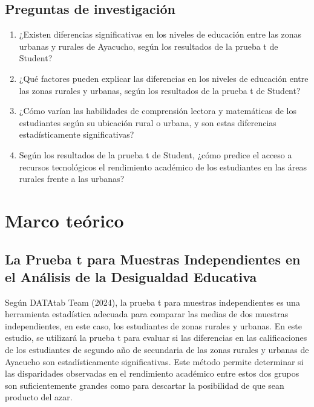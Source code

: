 \documentclass[
]{article}
\begin{document}
\subsection*{Preguntas de
investigación}\label{preguntas-de-investigaciuxf3n}

\begin{center}

\justify
\begin{enumerate}
    \item ¿Existen diferencias significativas en los niveles de educación entre las zonas urbanas y rurales de Ayacucho, según los resultados de la prueba t de Student?
    \item ¿Qué factores pueden explicar las diferencias en los niveles de educación entre las zonas rurales y urbanas, según los resultados de la prueba t de Student?
    \item ¿Cómo varían las habilidades de comprensión lectora y matemáticas de los estudiantes según su ubicación rural o urbana, y son estas diferencias estadísticamente significativas?
    \item Según los resultados de la prueba t de Student, ¿cómo predice el acceso a recursos tecnológicos el rendimiento académico de los estudiantes en las áreas rurales frente a las urbanas?
\end{enumerate}

\end{center}

\section*{Marco teórico}\label{marco-teuxf3rico}

\subsection*{La Prueba t para Muestras Independientes en el Análisis de
la Desigualdad
Educativa}\label{la-prueba-t-para-muestras-independientes-en-el-anuxe1lisis-de-la-desigualdad-educativa}

\vspace{0.5cm}

Según DATAtab Team (2024), la prueba t para muestras independientes es
una herramienta estadística adecuada para comparar las medias de dos
muestras independientes, en este caso, los estudiantes de zonas rurales
y urbanas. En este estudio, se utilizará la prueba t para evaluar si las
diferencias en las calificaciones de los estudiantes de segundo año de
secundaria de las zonas rurales y urbanas de Ayacucho son
estadísticamente significativas. Este método permite determinar si las
disparidades observadas en el rendimiento académico entre estos dos
grupos son suficientemente grandes como para descartar la posibilidad de
que sean producto del azar.
\end{document}
